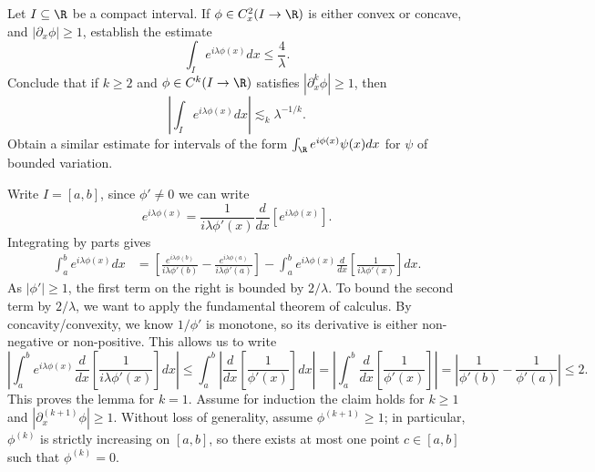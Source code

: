 \begin{statement}
	Let $I \subseteq \R$ be a compact interval. If $\phi \in C_x^2 (I \to \R)$ is either convex or concave, and $|\partial_x \phi| \geq 1$, establish the estimate
		\[ \int_I e^{i \lambda\phi (x)} dx \leq \frac{4}{\lambda}. \]
	Conclude that if $k \geq 2$ and $\phi \in C^k (I \to \R)$ satisfies $|\partial^k_x \phi| \geq 1$, then 
		\[ \left| \int_I e^{i \lambda \phi(x)} dx \right| \lesssim_k \lambda^{-1/k}. \]	
	Obtain a similar estimate for intervals of the form $\int_\R e^{i \phi(x)} \psi(x) dx$ for $\psi$ of bounded variation. 	
\end{statement}

\begin{solution}
	Write $I = [a, b]$, since $\phi' \neq 0$ we can write
		\[ e^{i \lambda \phi (x)} = \frac{1}{i \lambda \phi'(x)} \frac{d}{dx} \left[ e^{i \lambda \phi(x)} \right] . \]
	Integrating by parts gives
		\begin{align*}
			\int_a^b e^{i \lambda \phi(x)} dx
				&=  \left[ \frac{e^{i \lambda \phi(b)}}{i \lambda \phi'(b)} - \frac{e^{i \lambda \phi(a)}}{i \lambda \phi'(a)} \right] - \int_a^b e^{i \lambda \phi(x)} \frac{d}{dx} \left[ \frac{1}{i \lambda\phi' (x)} \right] dx.
		\end{align*}	
	As $|\phi'| \geq 1$, the first term on the right is bounded by $2/\lambda$. To bound the second term by $2/\lambda$, we want to apply the fundamental theorem of calculus. By concavity/convexity, we know $1/\phi'$ is monotone, so its derivative is either non-negative or non-positive. This allows us to write
		\[
		\left| \int_a^b e^{i \lambda \phi(x)} \frac{d}{dx} \left[ \frac{1}{i \lambda\phi' (x)} \right] dx \right| \leq \int_a^b \left| \frac{d}{dx} \left[ \frac{1}{\phi'(x)} \right] dx \right| = \left| \int_a^b \frac{d}{dx} \left[ \frac{1}{\phi'(x)} \right]\right| = \left| \frac{1}{\phi'(b)} - \frac{1}{\phi'(a)} \right| \leq 2.\]
	This proves the lemma for $k = 1$.  Assume for induction the claim holds for $k \geq 1$ and $|\partial^{(k + 1)}_x \phi| \geq 1$. Without loss of generality, assume $\phi^{(k + 1)} \geq 1$; in particular, $\phi^{(k)}$ is strictly increasing on $[a, b]$, so there exists at most one point $c \in [a, b]$ such that $\phi^{(k)} = 0$. 


\end{solution}
